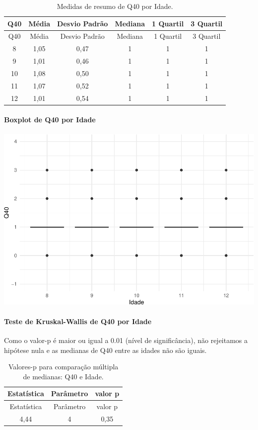 \documentclass[]{article}
\let\oldparagraph\paragraph
\renewcommand{\paragraph}[1]{\oldparagraph{#1}\mbox{}}
\begin{document}
\begin{longtable}[]{@{}cccccc@{}}
\caption{\label{tab:unnamed-chunk-1570}Medidas de resumo de Q40 por Idade.}\tabularnewline
\toprule
Q40 & Média & Desvio Padrão & Mediana & 1 Quartil & 3 Quartil\tabularnewline
\midrule
\endfirsthead
\toprule
Q40 & Média & Desvio Padrão & Mediana & 1 Quartil & 3 Quartil\tabularnewline
\midrule
\endhead
8 & 1,05 & 0,47 & 1 & 1 & 1\tabularnewline
9 & 1,01 & 0,46 & 1 & 1 & 1\tabularnewline
10 & 1,08 & 0,50 & 1 & 1 & 1\tabularnewline
11 & 1,07 & 0,52 & 1 & 1 & 1\tabularnewline
12 & 1,01 & 0,54 & 1 & 1 & 1\tabularnewline
\bottomrule
\end{longtable}

\hypertarget{boxplot-de-q40-por-idade}{%
\paragraph{Boxplot de Q40 por Idade}\label{boxplot-de-q40-por-idade}}

\begin{center}\includegraphics[width=0.75\linewidth]{relatorio_covid19_files/figure-latex/unnamed-chunk-1571-1} \end{center}

\hypertarget{teste-de-kruskal-wallis-de-q40-por-idade}{%
\paragraph{Teste de Kruskal-Wallis de Q40 por Idade}\label{teste-de-kruskal-wallis-de-q40-por-idade}}

Como o valor-p é maior ou igual a 0.01 (nível de significância), não rejeitamos a hipótese nula e as medianas de Q40 entre as idades não são iguais.

\begin{longtable}[]{@{}ccc@{}}
\caption{\label{tab:unnamed-chunk-1573}Valores-p para comparação múltipla de medianas: Q40 e Idade.}\tabularnewline
\toprule
Estatística & Parâmetro & valor p\tabularnewline
\midrule
\endfirsthead
\toprule
Estatística & Parâmetro & valor p\tabularnewline
\midrule
\endhead
4,44 & 4 & 0,35\tabularnewline
\bottomrule
\end{longtable}
\end{document}
